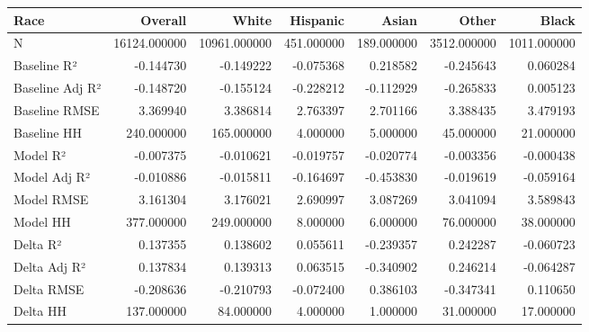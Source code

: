 \begin{tabular}{lrrrrrr}
\toprule
Race &       Overall &         White &    Hispanic &       Asian &        Other &        Black \\
\midrule
N               &  16124.000000 &  10961.000000 &  451.000000 &  189.000000 &  3512.000000 &  1011.000000 \\
Baseline R²     &     -0.144730 &     -0.149222 &   -0.075368 &    0.218582 &    -0.245643 &     0.060284 \\
Baseline Adj R² &     -0.148720 &     -0.155124 &   -0.228212 &   -0.112929 &    -0.265833 &     0.005123 \\
Baseline RMSE   &      3.369940 &      3.386814 &    2.763397 &    2.701166 &     3.388435 &     3.479193 \\
Baseline HH     &    240.000000 &    165.000000 &    4.000000 &    5.000000 &    45.000000 &    21.000000 \\
Model R²        &     -0.007375 &     -0.010621 &   -0.019757 &   -0.020774 &    -0.003356 &    -0.000438 \\
Model Adj R²    &     -0.010886 &     -0.015811 &   -0.164697 &   -0.453830 &    -0.019619 &    -0.059164 \\
Model RMSE      &      3.161304 &      3.176021 &    2.690997 &    3.087269 &     3.041094 &     3.589843 \\
Model HH        &    377.000000 &    249.000000 &    8.000000 &    6.000000 &    76.000000 &    38.000000 \\
Delta R²        &      0.137355 &      0.138602 &    0.055611 &   -0.239357 &     0.242287 &    -0.060723 \\
Delta Adj R²    &      0.137834 &      0.139313 &    0.063515 &   -0.340902 &     0.246214 &    -0.064287 \\
Delta RMSE      &     -0.208636 &     -0.210793 &   -0.072400 &    0.386103 &    -0.347341 &     0.110650 \\
Delta HH        &    137.000000 &     84.000000 &    4.000000 &    1.000000 &    31.000000 &    17.000000 \\
\bottomrule
\end{tabular}
